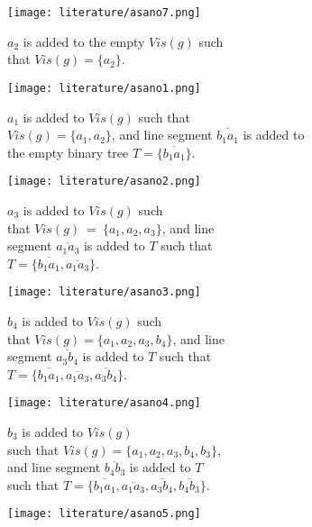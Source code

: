 \begin{figure}[h!]
	\centering
	\begin{subfigure}{0.45\linewidth}
		\texttt{[image: literature/asano7.png]}
		\caption{$a_2$ is added to the empty $\mathit{Vis}(g)$ such \\ that $\mathit{Vis}(g) = \{a_2\}$.}
		\label{fig:asano1}
	\end{subfigure}
	\begin{subfigure}{0.45\linewidth}
		\texttt{[image: literature/asano1.png]}
		\caption{$a_1$ is added to $\mathit{Vis}(g)$ such that \\ $\mathit{Vis}(g) = \{a_1, a_2\}$, and line segment $\overline{b_1a_1}$ is added to the empty binary tree $T = \{\overline{b_1a_1}\}$.}
	\end{subfigure}
	\begin{subfigure}{0.45\linewidth}
		\texttt{[image: literature/asano2.png]}
		\caption{$a_3$ is added to $\mathit{Vis}(g)$ such \\ that $\mathit{Vis}(g)~=~\{a_1, a_2, a_3\}$,  and line \\ segment $\overline{a_1a_3}$ is added to $T$ such that \\ $T = \{\overline{b_1a_1}, \overline{a_1a_3}\}$.}
	\end{subfigure}
	\begin{subfigure}{0.45\linewidth}
		\texttt{[image: literature/asano3.png]}
		\caption{$b_4$ is added to $\mathit{Vis}(g)$ such \\ that $\mathit{Vis}(g)=\{a_1, a_2, a_3, b_4\}$, and line \\ segment $\overline{a_3b_4}$ is added to $T$ such that \\ $T = \{\overline{b_1a_1}, \overline{a_1a_3}, \overline{a_3b_4}\}$.}
	\end{subfigure}
	\begin{subfigure}{0.45\linewidth}
		\texttt{[image: literature/asano4.png]}
		\caption{$b_3$ is added to $\mathit{Vis}(g)$ \\ such that $\mathit{Vis}(g)=\{a_1, a_2, a_3, b_4, b_3\}$, \\ and line segment $\overline{b_4b_3}$ is added to $T$ \\ such that $T = \{\overline{b_1a_1}, \overline{a_1a_3}, \overline{a_3b_4}, \overline{b_4b_3}\}$.}
	\end{subfigure}
	\begin{subfigure}{0.45\linewidth}
		\texttt{[image: literature/asano5.png]}

\end{subfigure}
\end{figure}
